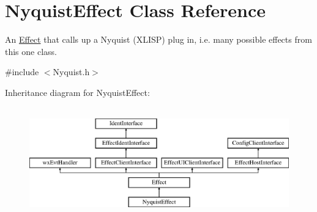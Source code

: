 \hypertarget{class_nyquist_effect}{}\section{Nyquist\+Effect Class Reference}
\label{class_nyquist_effect}


An \hyperlink{class_effect}{Effect} that calls up a Nyquist (X\+L\+I\+SP) plug in, i.\+e. many possible effects from this one class.  




{\ttfamily \#include $<$Nyquist.\+h$>$}

Inheritance diagram for Nyquist\+Effect\+:\begin{figure}[H]
\begin{center}
\leavevmode
\includegraphics[height=4.794520cm]{class_nyquist_effect}
\end{center}
\end{figure}
